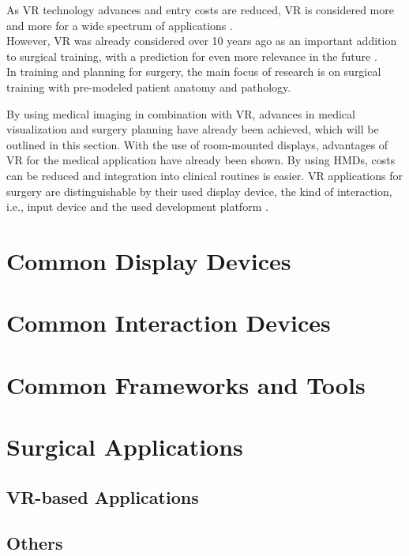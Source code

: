 As VR technology advances and entry costs are reduced, VR is considered more and more for a wide spectrum of applications \cite{Ayoub.2019, Berni.2020}.
\\ However, VR was already considered over 10 years ago as an important addition to surgical training, with a prediction for even more relevance in the future \cite{RN60}.
\\ In training and planning for surgery, the main focus of research is on surgical training with pre-modeled patient anatomy and pathology.

By using medical imaging in combination with VR, advances in medical visualization and surgery planning have already been achieved, which will be outlined in this section.
With the use of room-mounted displays, advantages of VR for the medical application have already been shown.
By using HMDs, costs can be reduced and integration into clinical routines is easier.
VR applications for surgery are distinguishable by their used display device, the kind of interaction, i.e., input device and the used development platform \cite{Vaughan.2016}.

\section{\label{sec::DisplayDevices}Common Display Devices}


\section{\label{sec::InteractionDevices}Common Interaction Devices}%


\section{\label{sec::FrameworksAndTools}Common Frameworks and Tools}


\section{\label{sec::SurgicalApplications}Surgical Applications}

\subsection{\label{sec::VRBasedApplications}VR-based Applications}


\subsection{\label{sec::Others}Others}%

